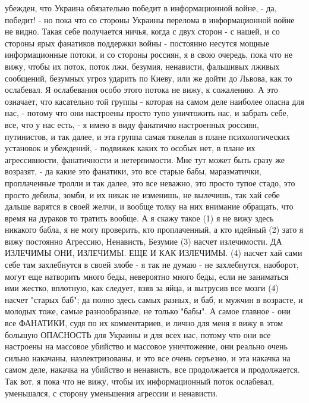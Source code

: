 убежден, что Украина обязательно победит в информационной войне, - да, победит!
- но пока что со стороны Украины перелома в информационной войне не видно.
Такая себе получается ничья, когда с двух сторон - с нашей, и со стороны ярых
фанатиков поддержки войны - постоянно несутся мощные информационные потоки, и
со стороны россиян, я в свою очередь, пока что не вижу, чтобы их поток, поток
лжи, безумия, ненависти, фальшивых лживых сообщений, безумных угроз ударить по
Киеву, или же дойти до Львова, как то ослабевал. Я ослабевания особо этого
потока не вижу, к сожалению.  А это означает, что касательно той группы -
которая на самом деле наиболее опасна для нас, - потому что они настроены
просто тупо уничтожить нас, и забрать себе, все, что у нас есть, - я имею в
виду фанатично настроенных россиян, путинистов, и так далее, и эта группа самая
тяжелая в плане психологических установок и убеждений, - подвижек каких то
особых нет, в плане их агрессивности, фанатичности и нетерпимости. Мне тут
может быть сразу же возразят, - да какие это фанатики, это все старые бабы,
маразматички, проплаченные тролли и так далее, это все неважно, это просто
тупое стадо, это просто дебилы, зомби, и их никак не изменишь, не вылечишь, так
хай себе дальше варятся в своей желчи, и вообще толку на них внимание обращать,
что время на дураков то тратить вообще.  А я скажу такое (1) я не вижу здесь
никакого бабла, я не могу проверить, кто проплаченный, а кто идейный (2) зато я
вижу постоянно Агрессию, Ненависть, Безумие (3) насчет излечимости. ДА ИЗЛЕЧИМЫ
ОНИ, ИЗЛЕЧИМЫ. ЕЩЕ И КАК ИЗЛЕЧИМЫ.  (4) насчет хай сами себе там захлебнутся в
своей злобе - я так не думаю - не захлебнутся, наоборот, могут еще натворить
много беды, невероятно много беды, если не заниматься ими жестко, вплотную, как
следует, взяв за яйца, и вытрусив все мозги (4) насчет "старых баб"; да полно
здесь самых разных, и баб, и мужчин в возрасте, и молодых тоже, самые
разнообразные, не только "бабы". А самое главное - они все ФАНАТИКИ, судя по их
комментариев, и лично для меня я вижу в этом большую ОПАСНОСТЬ для Украины и
для всех нас, потому что они все настроены на массовое убийство и массовое
уничтожение, они реально очень сильно накачаны, наэлектризованы, и это все
очень серъезно, и эта накачка на самом деле, накачка на убийство и ненависть,
все продолжается и продолжается. Так вот, я пока что не вижу, чтобы их
информационный поток ослабевал, уменьшался, с сторону уменьшения агрессии и
ненависти.

